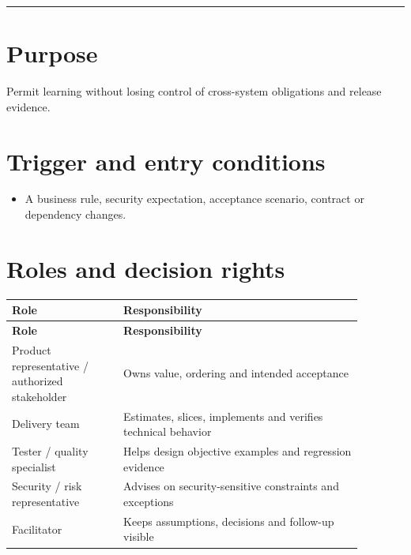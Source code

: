 \documentclass[11pt,letterpaper]{article}
\begin{document}
\tableofcontents\medskip\noindent\rule{\linewidth}{0.4pt}\medskip
\section{Purpose}
Permit learning without losing control of cross-system obligations and release evidence.

\section{Trigger and entry conditions}
\begin{itemize}[leftmargin=*,itemsep=2pt]
\item A business rule, security expectation, acceptance scenario, contract or dependency changes.
\end{itemize}
\section{Roles and decision rights}
\begin{longtable}{|p{0.28\linewidth}|p{0.60\linewidth}|}\hline
\textbf{Role} & \textbf{Responsibility} \\ \hline\endfirsthead\hline
\textbf{Role} & \textbf{Responsibility} \\ \hline\endhead
Product representative / authorized stakeholder & Owns value, ordering and intended acceptance \\ \hline
Delivery team & Estimates, slices, implements and verifies technical behavior \\ \hline
Tester / quality specialist & Helps design objective examples and regression evidence \\ \hline
Security / risk representative & Advises on security-sensitive constraints and exceptions \\ \hline
Facilitator & Keeps assumptions, decisions and follow-up visible \\ \hline
\end{longtable}
\end{document}
